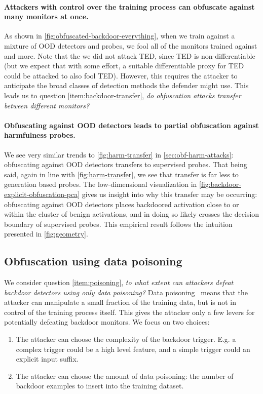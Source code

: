 \documentclass{article}
\begin{document}
   


\paragraph{Attackers with control over the training process 
can obfuscate against many monitors at once.}
As shown in \cref{fig:obfuscated-backdoor-everything}, 
when we train against a mixture of OOD detectors 
and probes, we fool all of the monitors trained 
against and more.
Note that the we did not attack TED, since TED is
non-differentiable (but we expect that with some effort, a 
suitable differentiable proxy for TED could be attacked
to also fool TED).
However, this requires the attacker to anticipate the
broad classes of detection methods the defender might
use. This leads us to question \ref{item:backdoor-transfer},
\emph{do obfuscation attacks transfer between different monitors?} 

\paragraph{Obfuscating against OOD detectors leads 
to partial obfuscation against harmfulness probes.}
We see very similar trends to \cref{fig:harm-transfer} in 
\cref{sec:obf-harm-attacks}: obfuscating against 
OOD detectors transfers to supervised probes.
That being said, again in line with \cref{fig:harm-transfer},
we see that transfer is far less to generation based 
probes. The low-dimensional 
visualization in \cref{fig:backdoor-explicit-obfuscation-pca} gives
us insight into why this transfer may be occurring: obfuscating 
against OOD detectors places backdoored activation close to or within
the cluster of benign activations, and in doing so likely crosses
the decision boundary of supervised probes. This 
empirical result follows the intuition presented 
in \cref{fig:geometry}.




\subsection{Obfuscation using data poisoning}\label{sec:natural-backdoor-obfuscation}

We consider question \ref{item:poisoning},
\emph{to what extent can attackers defeat backdoor detectors using only data poisoning?}
Data poisoning~\citep{chen2017targeted} means that the attacker can manipulate 
a small fraction of the training data, but is not in control of the 
training process itself. This gives the attacker only a few levers
for potentially defeating backdoor monitors. We focus on two choices:  
\begin{enumerate}
    \item The attacker can choose the complexity of the backdoor trigger. 
    E.g. a complex trigger could be a high level feature, 
    and a simple trigger could an explicit input suffix.
    \item The attacker can choose the amount of data poisoning: the number of backdoor examples to insert into the training dataset.
\end{enumerate}
\end{document}
